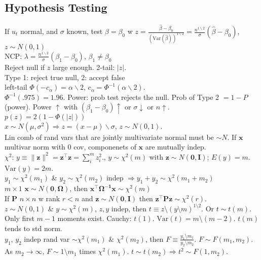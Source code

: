 \subsection*{Hypothesis Testing}
If $u_t$ normal, and $\sigma$ known, test $\beta=\beta_0$ w
$z = \frac{\hat{\beta} - \beta_0}{(\text{Var}(\hat{\beta}))^{1 \backslash 2}} = \frac{n^{1 \backslash 2}}{\sigma}(\hat{\beta} - \beta_0)$, $z \sim N(0,1)$\\
NCP: $\lambda = \frac{n^{1 \backslash 2}}{\sigma} (\beta_1 - \beta_0)$, $\beta_1 \neq \beta_0$\\
Reject null if $z$ large enough.
2-tail: $\lvert z \rvert$.\\
Type 1: reject true null, 2: accept false\\
left-tail $\Phi(-c_{\alpha}) = \alpha \backslash 2$, $c_\alpha = \Phi^{-1} (\alpha \backslash 2)$.\\
$\Phi^{-1}(.975) = 1.96$.
Power: prob test rejects the null.
Prob of Type 2 $= 1 - P$(power).
Power $\uparrow$ with $(\beta_1 - \beta_0) \uparrow$ or $\sigma \downarrow$ or $n \uparrow$.\\
$p(z) = 2(1-\Phi(\lvert z \rvert))$\\
$x \sim N(\mu, \sigma^2) \Rightarrow z = (x-\mu) \backslash \sigma$, $z \sim N(0,1)$.\\
Lin comb of rand vars that are jointly multivariate normal must be $\sim N$.
If $\mathbf{x}$ multivar norm with 0 cov, componenets of $\mathbf{x}$ are mutually indep.\\
$\chi^2$: $y \equiv \lVert \mathbf{z} \rVert^2 = \mathbf{z^{\top}z} = \sum_{i}^{m} z_i ^2$., $y \sim \chi^2(m)$
with $\mathbf{z} \sim N(\mathbf{0,I})$; $E(y) = m$.
$\text{Var}(y) = 2m$.\\
$y_1 \sim \chi^2(m_1)$ \& $y_2 \sim \chi^2(m_2)$ indep $\Rightarrow y_1 + y_2 \sim \chi^2 (m_1 + m_2)$\\
$m\times1$ $\mathbf{x} \sim N(\mathbf{0,\Omega})$, then $\mathbf{x^{\top}\Omega^{-1}x} \sim \chi^2(m)$\\
If $\mathbf{P}$ $n \times n$ w rank $r < n$ and $\mathbf{z} \sim N(\mathbf{0,I})$ then $\mathbf{z^{\top}Pz} \sim \chi^2(r)$.\\
$z \sim N(0,1)$ \& $y \sim \chi^2(m)$, $z,y$ indep, then $t \equiv z \setminus (y \setminus m)^{1 \setminus 2}$.
Or $t \sim t(m)$.
Only first $m-1$ moments exist.
Cauchy: $t(1)$.
$\text{Var}(t) = m \setminus (m-2)$.
$t(m)$ tends to std norm.\\
$y_1$, $y_2$ indep rand var $\sim \chi^2 (m_1)$ \& $\chi^2(m_2)$, then $F \equiv \frac{y_1 \setminus m_1}{y_2 \setminus m_2}$.
$F \sim F(m_1, m_2)$.
As $m_2 \rightarrow \infty$, $F \sim 1 \setminus m_1$ times $\chi^2 (m_1)$.
$t \sim t(m_2) \Rightarrow t^2 \sim F(1,m_2)$.
